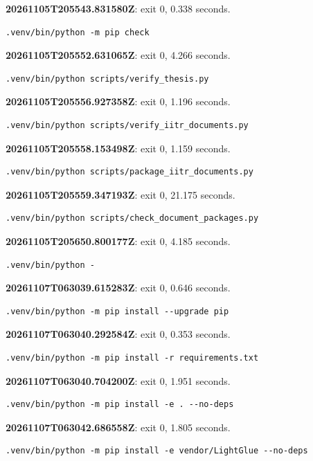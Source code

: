\noindent\textbf{20261105T205543.831580Z}: exit 0, 0.338 seconds.
\begin{lstlisting}[numbers=none]
.venv/bin/python -m pip check
\end{lstlisting}

\noindent\textbf{20261105T205552.631065Z}: exit 0, 4.266 seconds.
\begin{lstlisting}[numbers=none]
.venv/bin/python scripts/verify_thesis.py
\end{lstlisting}

\noindent\textbf{20261105T205556.927358Z}: exit 0, 1.196 seconds.
\begin{lstlisting}[numbers=none]
.venv/bin/python scripts/verify_iitr_documents.py
\end{lstlisting}

\noindent\textbf{20261105T205558.153498Z}: exit 0, 1.159 seconds.
\begin{lstlisting}[numbers=none]
.venv/bin/python scripts/package_iitr_documents.py
\end{lstlisting}

\noindent\textbf{20261105T205559.347193Z}: exit 0, 21.175 seconds.
\begin{lstlisting}[numbers=none]
.venv/bin/python scripts/check_document_packages.py
\end{lstlisting}

\noindent\textbf{20261105T205650.800177Z}: exit 0, 4.185 seconds.
\begin{lstlisting}[numbers=none]
.venv/bin/python -
\end{lstlisting}

\noindent\textbf{20261107T063039.615283Z}: exit 0, 0.646 seconds.
\begin{lstlisting}[numbers=none]
.venv/bin/python -m pip install --upgrade pip
\end{lstlisting}

\noindent\textbf{20261107T063040.292584Z}: exit 0, 0.353 seconds.
\begin{lstlisting}[numbers=none]
.venv/bin/python -m pip install -r requirements.txt
\end{lstlisting}

\noindent\textbf{20261107T063040.704200Z}: exit 0, 1.951 seconds.
\begin{lstlisting}[numbers=none]
.venv/bin/python -m pip install -e . --no-deps
\end{lstlisting}

\noindent\textbf{20261107T063042.686558Z}: exit 0, 1.805 seconds.
\begin{lstlisting}[numbers=none]
.venv/bin/python -m pip install -e vendor/LightGlue --no-deps
\end{lstlisting}

